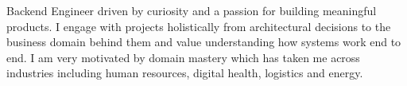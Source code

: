 

\begin{cvparagraph}

Backend Engineer driven by curiosity and a passion for building meaningful products. I engage with projects holistically from architectural decisions to the business domain behind them and value understanding how systems work end to end. I am very motivated by domain mastery which has taken me across industries including human resources, digital health, logistics and energy.

\end{cvparagraph}
